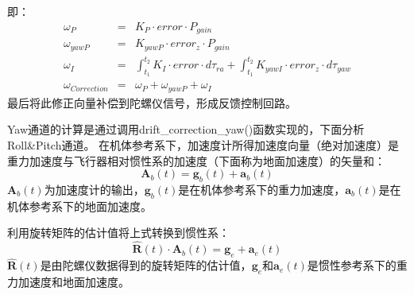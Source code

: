 \documentclass[a4paper,10pt]{ctexart} %
\begin{document}
即：
\begin{eqnarray}
\omega_{P}& = & K_P\cdot error\cdot P_{gain}\\\nonumber
\omega_{yawP}& = & K_{yawP}\cdot error_z\cdot P_{gain}\\\nonumber
\omega_{I}& = & \int_{t_1}^{t_2}{K_I\cdot error\cdot d\tau_{ra}}+\int_{t_1}^{t_2}{K_{yawI}\cdot error_z\cdot d\tau_{yaw}}\\
\omega_{Correction} & = & \omega_{P}+\omega_{yawP}+\omega_{I}\nonumber
\end{eqnarray}
最后将此修正向量补偿到陀螺仪信号，形成反馈控制回路。

Yaw通道的计算是通过调用drift\_correction\_yaw()函数实现的，下面分析Roll\&Pitch通道。
在机体参考系下，加速度计所得加速度向量（绝对加速度）是重力加速度与飞行器相对惯性系的加速度（下面称为地面加速度）的矢量和：
\begin{equation}
\mathbf{A}_b(t)=\mathbf{g}_b(t)+\mathbf{a}_b(t)
\end{equation}
$\mathbf{A}_b(t)$为加速度计的输出，$\mathbf{g}_b(t)$是在机体参考系下的重力加速度，$\mathbf{a}_b(t)$是在机体参考系下的地面加速度。

利用旋转矩阵的估计值将上式转换到惯性系：
\begin{equation}
\hat{\mathbf{R}}(t)\cdot\mathbf{A}_b(t)=\mathbf{g}_e+\mathbf{a}_e(t)
\end{equation}
$\hat{\mathbf{R}}(t)$是由陀螺仪数据得到的旋转矩阵的估计值，$\mathbf{g}_e$和$\mathbf{a}_e(t)$是惯性参考系下的重力加速度和地面加速度。
\end{document}
